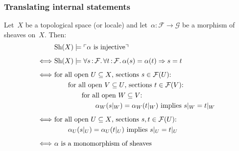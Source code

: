 \documentclass[12pt,utf8,notheorems,compress,t]{beamer}
\newcommand{\F}{\mathcal{F}}
\renewcommand{\G}{\mathcal{G}}
\newcommand{\Sh}{\mathrm{Sh}}
\renewcommand{\_}{\mathpunct{.}}
\newcommand{\?}{\,{:}\,}
\newcommand{\speak}[1]{\ulcorner\text{\textnormal{#1}}\urcorner}
\newcommand{\backupend}{
  \addtocounter{framenumberpreappendix}{-\value{framenumber}}
  \addtocounter{framenumber}{\value{framenumberpreappendix}} 
}
\begin{document}
\begin{frame}\frametitle{Translating internal statements}
  Let~$X$ be a topological space (or locale) and let~$\alpha : \F \to \G$ be a
  morphism of sheaves on~$X$. Then:
  \allowdisplaybreaks
  \begin{align*}
    & \Sh(X) \models \speak{$\alpha$ is injective} \\[0.5em]
    \Longleftrightarrow\
    & \Sh(X) \models \forall s\?\F\_ \forall t\?\F\_ \alpha(s) = \alpha(t) \Rightarrow s = t \\[0.5em]
    \Longleftrightarrow\ &
      \text{for all open~$U \subseteq X$, sections $s \in \F(U)$:} \\
    &\qquad
      \text{for all open~$V \subseteq U$, sections $t \in \F(V)$:} \\
    &\qquad\qquad
        \text{for all open~$W \subseteq V$:} \\
    &\qquad\qquad\qquad
          \text{$\alpha_W(s|_W) = \alpha_W(t|_W)$ implies $s|_W = t|_W$} \\[0.5em]
    \Longleftrightarrow\ &
      \text{for all open~$U \subseteq X$, sections $s, t \in \F(U)$:} \\
    &\qquad
          \text{$\alpha_U(s|_U) = \alpha_U(t|_U)$ implies $s|_U = t|_U$} \\[0.5em]
    \Longleftrightarrow\ &
      \text{$\alpha$ is a monomorphism of sheaves}
  \end{align*}
\end{frame}

\backupend
\end{document}
